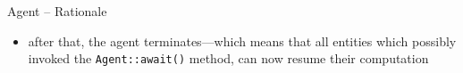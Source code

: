 \documentclass[presentation]{beamer}\mode<presentation>{\usetheme{AMSCesenaPurpleAndGold}}
\begin{document}
\begin{frame}[allowframebreaks]{Agent -- Rationale}
\begin{itemize}
        
        
        
        
        
        
        
        
        
            
        
        \item after that, the agent \alert{terminates}---which means that all entities which possibly invoked the \texttt{Agent::\alert{await()}} method, can now resume their computation
        

\end{itemize}
\end{frame}
\end{document}
